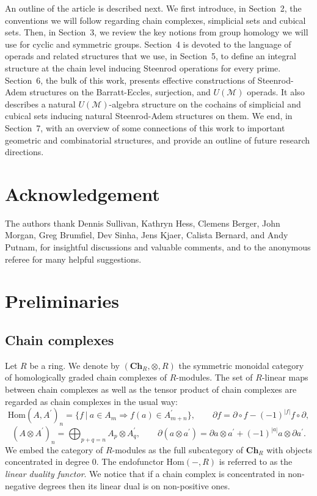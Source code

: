 \documentclass[A4]{amsart}
\theoremstyle{definition}
\newcommand{\Hom}{\mathrm{Hom}}
\begin{document}
An outline of the article is described next. We first introduce, in Section~2, the conventions we will follow regarding chain complexes, simplicial sets and cubical sets. Then, in Section~3, we review the key notions from group homology we will use for cyclic and symmetric groups. Section~4 is devoted to the language of operads and related structures that we use, in Section~5, to define an integral structure at the chain level inducing Steenrod operations for every prime. Section~6, the bulk of this work, presents effective constructions of Steenrod-Adem structures on the Barratt-Eccles, surjection, and $U(\mathcal M)$ operads. It also describes a natural $U(\mathcal M)$-algebra structure on the cochains of simplicial and cubical sets inducing natural Steenrod-Adem structures on them.
We end, in Section~7, with an overview of some connections of this work to important geometric and combinatorial structures, and provide an outline of future research directions.

\section*{Acknowledgement}

The authors thank Dennis Sullivan, Kathryn Hess, Clemens Berger, John Morgan, Greg Brumfiel, Dev Sinha, Jens Kjaer, Calista Bernard, and Andy Putnam, for insightful discussions and valuable comments, and to the anonymous referee for many helpful suggestions.

\section{Preliminaries}

\subsection{Chain complexes}
\label{ssec: chain cpx}

Let $R$ be a ring. We denote by $(\mathbf{Ch}_R, \otimes, R)$ the symmetric monoidal category of homologically graded chain complexes of $R$-modules. The set of $R$-linear maps between chain complexes as well as the tensor product of chain complexes are regarded as chain complexes in the usual way:
\begin{equation*}
\Hom(A, A^\prime)_n = \big\{f \ |\ a \in A_m \Rightarrow f(a) \in A^\prime_{m+n} \big\}, \qquad
\partial f = \partial \circ f - (-1)^{|f|}f \circ \partial,
\end{equation*}
\begin{equation*}
(A \otimes A^\prime)_n = \bigoplus_{p + q = n} A_p \otimes A^\prime_q, \qquad \partial (a \otimes a^\prime) = \partial a \otimes a^\prime + (-1)^{|a|} a \otimes \partial a^\prime.
\end{equation*}
We embed the category of $R$-modules as the full subcategory of $\mathbf{Ch}_R$ with objects concentrated in degree $0$. The endofunctor $\Hom(-, R)$ is referred to as the \textit{linear duality functor}. We notice that if a chain complex is concentrated in non-negative degrees then its linear dual is on non-positive ones.
\end{document}
